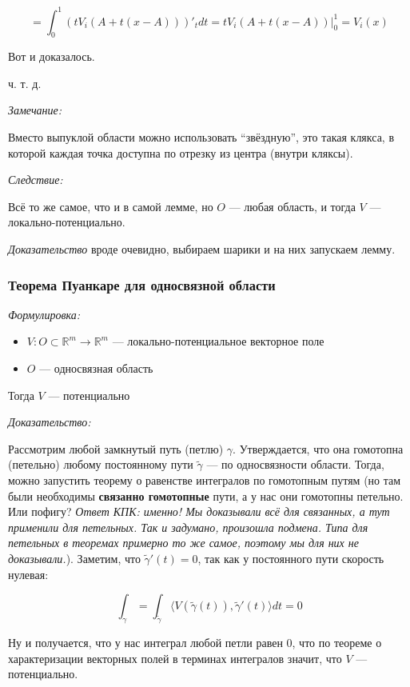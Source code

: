 \documentclass{article}
\def\sk#1#2{\langle #1, #2 \rangle}
\begin{document}
\[ = \int_0^1 \left(tV_i(A + t(x - A))\right)'_t dt = tV_i(A + t(x - A))|_0^1 = V_i(x)\]

Вот и доказалось.

ч. т. д. 

\textit{Замечание:}

Вместо выпуклой области можно использовать ``звёздную'', это такая клякса, в которой каждая точка доступна по отрезку из центра (внутри кляксы).

\textit{Следствие:}

Всё то же самое, что и в самой лемме, но $O$ --- любая область, и тогда $V$ --- локально-потенциально.

\textit{Доказательство} вроде очевидно, выбираем шарики и на них запускаем лемму.


\subsubsection{Теорема Пуанкаре для односвязной области}
\textit{Формулировка:}

\begin{itemize}
    \item $V: O \subset \mathbb{R}^m \rightarrow \mathbb{R}^m$ --- локально-потенциальное векторное поле
    \item $O$ --- односвязная область 
\end{itemize}

Тогда $V$ --- потенциально

\textit{Доказательство:}

Рассмотрим любой замкнутый путь (петлю) $\gamma$. Утверждается, что она гомотопна (петельно) любому постоянному пути $\tilde{\gamma}$ --- по односвязности области. Тогда, можно запустить теорему о равенстве интегралов по гомотопным путям (но там были необходимы \textbf{связанно гомотопные} пути, а у нас они гомотопны петельно. Или пофигу? \textit{Ответ КПК: именно! Мы доказывали всё для связанных, а тут применили для петельных. Так и задумано, произошла подмена. Типа для петельных в теоремах примерно то же самое, поэтому мы для них не доказывали.}). Заметим, что $\tilde{\gamma}'(t) = 0$, так как у постоянного пути скорость нулевая:

\[\int_{\gamma} = \int_{\tilde{\gamma}} \sk{V(\tilde{\gamma}(t))}{\tilde{\gamma}'(t)}dt = 0\]

Ну и получается, что у нас интеграл любой петли равен 0, что по теореме о характеризации векторных полей в терминах интегралов значит, что $V$ --- потенциально.
\end{document}
